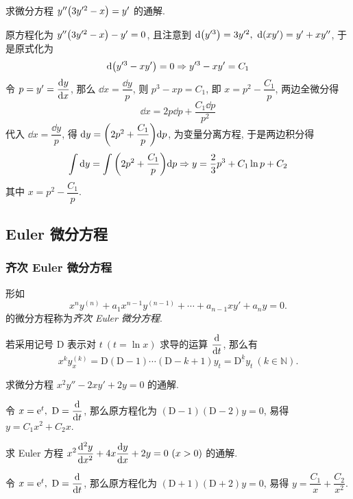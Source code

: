 \begin{example}
    求微分方程 $y''\qty(3y'^2-x)=y'$ 的通解.
\end{example}
\begin{solution}
    原方程化为 $y''\qty(3y'^2-x)-y'=0$, 且注意到 $\dd \qty(y'^3)=3y'^2,~\dd \qty(xy')=y'+xy''$, 于是原式化为
    $$\dd \qty(y'^3-xy')=0\Rightarrow y'^3-xy'=C_1$$
    令 $p=y'=\displaystyle\dv{y}{x}$, 那么 $\dd x=\dfrac{\dd y}{p}$, 则 $p^3-xp=C_1$, 即 $x=p^2-\dfrac{C_1}{p}$,
    两边全微分得 $$\dd x=2p\dd p+\dfrac{C_1\dd p}{p^2}$$
    代入 $\dd x=\dfrac{\dd y}{p}$, 得 $\dd y=\qty(2p^2+\dfrac{C_1}{p})\dd p$, 为变量分离方程, 于是两边积分得
    $$\int\dd y=\int\qty(2p^2+\dfrac{C_1}{p})\dd p\Rightarrow y=\dfrac{2}{3}p^3+C_1\ln p+C_2$$
    其中 $x=p^2-\dfrac{C_1}{p}.$
\end{solution}

\subsection{Euler 微分方程}

\subsubsection{齐次 Euler 微分方程}

\begin{definition}
    形如 $$x^ny^{(n)}+a_1x^{n-1}y^{(n-1)}+\cdots+a_{n-1}xy'+a_ny=0.$$
    的微分方程称为\textit{齐次 Euler 微分方程}.
\end{definition}

\begin{theorem}
    若采用记号 $\mathrm{D}$ 表示对 $t~(t=\ln x)$ 求导的运算 $\displaystyle\dv{t}$, 那么有
    $$x^ky_{x}^{(k)}=\mathrm{D}(\mathrm{D}-1)\cdots(\mathrm{D}-k+1)y_{t}=\mathrm{D}^{\underline{k}}y_{t}~(k\in \mathbb{N}).$$
\end{theorem}

\begin{example}
    \label{x2y2xy2y0}求微分方程 $x^2y''-2xy'+2y=0$ 的通解.
\end{example}
\begin{solution}
    令 $x=\mathrm{e} ^t,~\mathrm{D}=\displaystyle\dv{t}$, 那么原方程化为 $(\mathrm{D}-1)(\mathrm{D}-2)y=0$, 易得 $y=C_1x^2+C_2x.$
\end{solution}

\begin{example}
    求 Euler 方程 $\displaystyle x^2\dv[2]{y}{x}+4x\dv{y}{x}+2y=0~(x>0)$ 的通解.
\end{example}
\begin{solution}
    令 $x=\mathrm{e} ^t,~\mathrm{D}=\displaystyle\dv{t}$, 那么原方程化为 $(\mathrm{D}+1)(\mathrm{D}+2)y=0$, 易得 $y=\dfrac{C_1}{x}+\dfrac{C_2}{x^2}.$
\end{solution}

